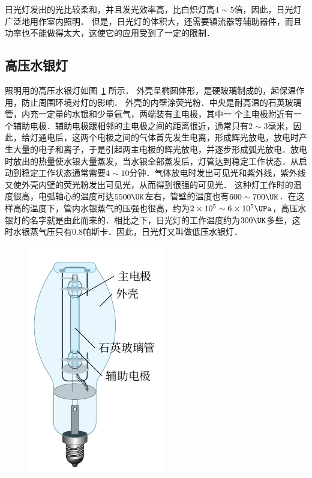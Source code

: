 日光灯发出的光比较柔和，并且发光效率高，比白炽灯高$4 \sim 5$倍，因此，日光灯广泛地用作室内照明．
但是，日光灯的体积大，还需要镇流器等辅助器件，而且功率也不能做得太大，这使它的应用受到了一定的限制．

\subsection{高压水银灯}

照明用的高压水银灯如图~\ref{fig_B_8-13} 所示．
外壳呈椭圆体形，是硬玻璃制成的，起保温作用，防止周围环境对灯的影响．
外壳的内壁涂荧光粉．中央是耐高温的石英玻璃管，内充一定量的水银和少量氩气，两端装有主电极，其中一
个主电极附近有一个辅助电极．辅助电极跟相邻的主电极之间的距离很近，通常只有$2 \sim 3$毫米，因此，给灯通电后，这两个电极之间的气体首先发生电离，形成辉光放电，放电时产生大量的电子和离子，于是引起两主电极的辉光放电，并逐步形成弧光放电．放电时放出的热量使水银大量蒸发，当水银全部蒸发后，灯管达到稳定工作状态．从启动到稳定工作状态通常需要$4 \sim 10$分钟．气体放电时发出可见光和紫外线，紫外线又使外壳内壁的荧光粉发出可见光，从而得到很强的可见光．
这种灯工作时的温度很高，电弧轴心的温度可达$ 5500\UK $左右，管壁的温度也有$600 \sim 700\UK $．在这样高的温度下，管内水银蒸气的压强也很高，约为$2\times10^5 \sim 6\times10^5 \UPa$，高压水银灯的名字就是由此而来的．相比之下，日光灯的工作温度约为$ 300 \UK $多些，这时水银蒸气压只有0.8帕斯卡．因此，日光灯又叫做低压水银灯．
\begin{figure}[htbp]
    \centering
    \includegraphics{fig/B/8-13.pdf}
    \caption{}\label{fig_B_8-13}
\end{figure}

